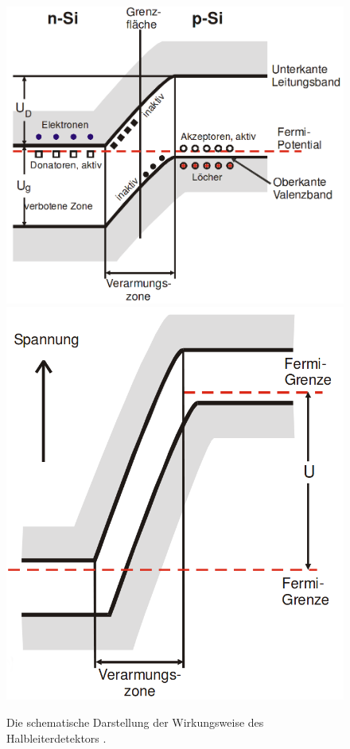 \begin{figure}
	\centering
    \includegraphics[width=\linewidth-250pt,height=\textheight-200pt,keepaspectratio]{content/Images/detek.png}
    \includegraphics[width=\linewidth-250pt,height=\textheight-200pt,keepaspectratio]{content/Images/fermikante.png}
    \caption{Die schematische Darstellung der Wirkungsweise des Halbleiterdetektors \cite{V18}.}
    \label{fig:POTENTIAL}
\end{figure}
